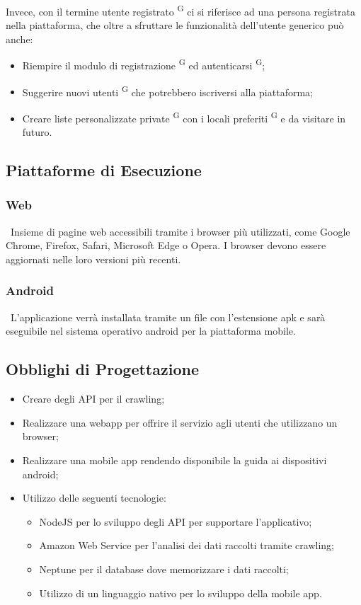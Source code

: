 \documentclass[letterpaper]{article}
\begin{document}
Invece, con il termine utente registrato \textsuperscript{G} ci si riferisce ad una persona registrata nella piattaforma, che oltre a sfruttare le funzionalità dell’utente generico può anche:

\begin{itemize}
  \item Riempire il modulo di registrazione \textsuperscript{G} ed autenticarsi \textsuperscript{G};
  \item Suggerire nuovi utenti \textsuperscript{G} che potrebbero iscriversi alla piattaforma;
  \item Creare liste personalizzate private \textsuperscript{G} con i locali preferiti \textsuperscript{G} e da visitare in futuro.
\end{itemize}

\subsection{Piattaforme di Esecuzione}

\subsubsection{Web} \ 
Insieme di pagine web accessibili tramite i browser più utilizzati, come Google Chrome, Firefox, Safari, Microsoft Edge o Opera. I browser devono essere aggiornati nelle loro versioni più recenti.

\subsubsection{Android} \ 
L'applicazione verrà installata tramite un file con l’estensione apk e sarà eseguibile nel sistema operativo android per la piattaforma mobile.

\subsection{Obblighi di Progettazione}
\begin{itemize}
  \item Creare degli API per il crawling;
  \item Realizzare una webapp per offrire il servizio agli utenti che utilizzano un browser;
  \item Realizzare una mobile app rendendo disponibile la guida ai dispositivi android;
  \item Utilizzo delle seguenti tecnologie: \begin{itemize}
    \item NodeJS per lo sviluppo degli API per supportare l’applicativo;
    \item Amazon Web Service per l'analisi dei dati raccolti tramite crawling;
    \item Neptune per il database dove memorizzare i dati raccolti;
    \item Utilizzo di un linguaggio nativo per lo sviluppo della mobile app.
  \end{itemize}

\end{itemize}
\end{document}
